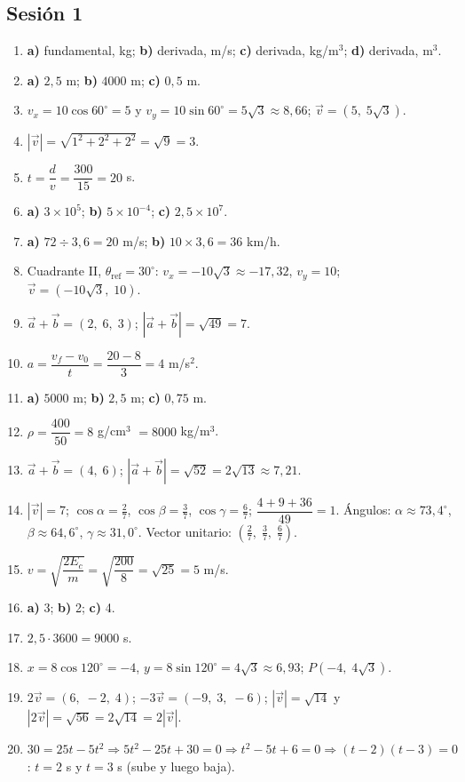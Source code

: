 \documentclass[12pt, letterpaper]{article}
\providecommand{\sen}{\sin}
\begin{document}
\subsection*{Sesión 1}
\begin{enumerate}[leftmargin=*, label=\textbf{\arabic*.}]
  \item \textbf{a)} fundamental, kg; \textbf{b)} derivada, m/s; \textbf{c)} derivada, kg/m$^3$; \textbf{d)} derivada, m$^3$.
  \item \textbf{a)} $2{,}5$ m; \textbf{b)} $4000$ m; \textbf{c)} $0{,}5$ m.
  \item $v_x=10\cos 60^{\circ}=5$ y $v_y=10\sen 60^{\circ}=5\sqrt{3}\approx 8{,}66$; $\vec v=(5,\; 5\sqrt{3})$.
  \item $|\vec v|=\sqrt{1^2+2^2+2^2}=\sqrt{9}=3$.
  \item $t=\dfrac{d}{v}=\dfrac{300}{15}=20$ s.
  \item \textbf{a)} $3 \times 10^{5}$; \textbf{b)} $5 \times 10^{-4}$; \textbf{c)} $2{,}5 \times 10^{7}$.
  \item \textbf{a)} $72 \div 3{,}6 = 20$ m/s; \quad \textbf{b)} $10 \times 3{,}6 = 36$ km/h.
  \item Cuadrante II, $\theta_{\text{ref}}=30^{\circ}$: $v_x=-10\sqrt{3}\approx -17{,}32$, $v_y=10$; $\vec v=(-10\sqrt{3},\; 10)$.
  \item $\vec a+\vec b=(2,\; 6,\; 3)$; $|\vec a+\vec b|=\sqrt{49}=7$.
  \item $a=\dfrac{v_f-v_0}{t}=\dfrac{20-8}{3}=4$ m/s$^2$.
  \item \textbf{a)} $5000$ m; \textbf{b)} $2{,}5$ m; \textbf{c)} $0{,}75$ m.
  \item $\rho=\dfrac{400}{50}=8$ g/cm$^3$ $=8000$ kg/m$^3$.
  \item $\vec a+\vec b=(4,\; 6)$; $|\vec a+\vec b|=\sqrt{52}=2\sqrt{13}\approx 7{,}21$.
  \item $|\vec v|=7$; $\cos\alpha=\frac{2}{7}$, $\cos\beta=\frac{3}{7}$, $\cos\gamma=\frac{6}{7}$; $\dfrac{4+9+36}{49}=1$. \checkmark\quad Ángulos: $\alpha\approx 73{,}4^{\circ}$, $\beta\approx 64{,}6^{\circ}$, $\gamma\approx 31{,}0^{\circ}$. Vector unitario: $(\frac{2}{7},\; \frac{3}{7},\; \frac{6}{7})$.
  \item $v=\sqrt{\dfrac{2E_c}{m}}=\sqrt{\dfrac{200}{8}}=\sqrt{25}=5$ m/s.
  \item \textbf{a)} 3; \quad \textbf{b)} 2; \quad \textbf{c)} 4.
  \item $2{,}5\cdot 3600=9000$ s.
  \item $x=8\cos 120^{\circ}=-4$, $y=8\sen 120^{\circ}=4\sqrt{3}\approx 6{,}93$; $P(-4,\; 4\sqrt{3})$.
  \item $2\vec v=(6,\; -2,\; 4)$; $-3\vec v=(-9,\; 3,\; -6)$; $|\vec v|=\sqrt{14}$ y $|2\vec v|=\sqrt{56}=2\sqrt{14}=2|\vec v|$. \checkmark
  \item $30=25t-5t^2\Rightarrow 5t^2-25t+30=0\Rightarrow t^2-5t+6=0\Rightarrow(t-2)(t-3)=0$: $t=2$ s y $t=3$ s (sube y luego baja).
\end{enumerate}
\end{document}
